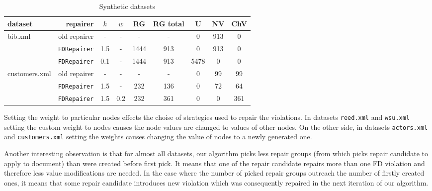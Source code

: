 \begin{table}
    \begin{tabular}{| l | r | *{7}{c|}}
    \hline
    dataset & repairer & $k$ & $w$ & RG & RG total & U & NV & ChV\\ \hline
    \multirow{3}{*}{bib.xml} & old repairer & - & - & - & - & 0 & 913 & 0\\
    & \texttt{FDRepairer} & 1.5 & - & 1444 & 913 & 0 & 913 & 0\\
    & \texttt{FDRepairer} & 0.1 & - & 1444 & 913 & 5478 & 0 & 0\\ \hline
    \multirow{3}{*}{customers.xml} & old repairer & - & - & - & - & 0 & 99 & 99\\
    & \texttt{FDRepairer} & 1.5 & - & 232 & 136 & 0 & 72 & 64\\
    & \texttt{FDRepairer} & 1.5 & 0.2 & 232 & 361 & 0 & 0 & 361\\\hline
    \end{tabular}
\caption{Synthetic datasets}
\label{syntheticTable}
\end{table}

Setting the weight to particular nodes effects the choise of strategies used to repair the violations. In datasets \texttt{reed.xml} and \texttt{wsu.xml} setting the custom weight to nodes causes the node values are changed to values of other nodes. On the other side, in datasets \texttt{actors.xml} and \texttt{customers.xml} setting the weights causes changing the value of nodes to a newly generated one.

Another interesting observation is that for almost all datasets, our algorithm picks less repair groups (from which picks repair candidate to apply to document) than were created before first pick. It means that one of the repair candidate repairs more than one FD violation and therefore less value modifications are needed. In the case where the number of picked repair groups outreach the number of firstly created ones, it means that some repair candidate introduces new violation which was consequently repaired in the next iteration of our algorithm.
